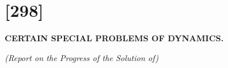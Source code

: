 \documentclass[12pt,a4paper]{article}
\theoremstyle{definition}
\begin{document}

\section*{[298]}

\begin{center}
\Large\bfseries CERTAIN SPECIAL PROBLEMS OF DYNAMICS.
\end{center}

\begin{center}
\textit{(Report on the Progress of the Solution of)}
\end{center}

\vspace{1em}
\end{document}
